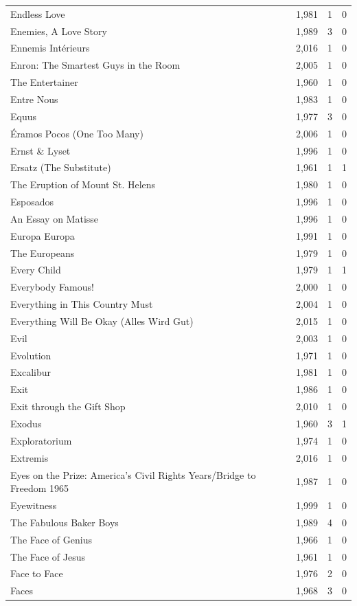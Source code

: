 \begin{tabular}{lrrr}
Endless Love & 1,981 & 1 & 0 \\
Enemies, A Love Story & 1,989 & 3 & 0 \\
Ennemis Intérieurs & 2,016 & 1 & 0 \\
Enron: The Smartest Guys in the Room & 2,005 & 1 & 0 \\
The Entertainer & 1,960 & 1 & 0 \\
Entre Nous & 1,983 & 1 & 0 \\
Equus & 1,977 & 3 & 0 \\
Éramos Pocos (One Too Many) & 2,006 & 1 & 0 \\
Ernst \& Lyset & 1,996 & 1 & 0 \\
Ersatz (The Substitute) & 1,961 & 1 & 1 \\
The Eruption of Mount St. Helens & 1,980 & 1 & 0 \\
Esposados & 1,996 & 1 & 0 \\
An Essay on Matisse & 1,996 & 1 & 0 \\
Europa Europa & 1,991 & 1 & 0 \\
The Europeans & 1,979 & 1 & 0 \\
Every Child & 1,979 & 1 & 1 \\
Everybody Famous! & 2,000 & 1 & 0 \\
Everything in This Country Must & 2,004 & 1 & 0 \\
Everything Will Be Okay (Alles Wird Gut) & 2,015 & 1 & 0 \\
Evil & 2,003 & 1 & 0 \\
Evolution & 1,971 & 1 & 0 \\
Excalibur & 1,981 & 1 & 0 \\
Exit & 1,986 & 1 & 0 \\
Exit through the Gift Shop & 2,010 & 1 & 0 \\
Exodus & 1,960 & 3 & 1 \\
Exploratorium & 1,974 & 1 & 0 \\
Extremis & 2,016 & 1 & 0 \\
Eyes on the Prize: America's Civil Rights Years/Bridge to Freedom 1965 & 1,987 & 1 & 0 \\
Eyewitness & 1,999 & 1 & 0 \\
The Fabulous Baker Boys & 1,989 & 4 & 0 \\
The Face of Genius & 1,966 & 1 & 0 \\
The Face of Jesus & 1,961 & 1 & 0 \\
Face to Face & 1,976 & 2 & 0 \\
Faces & 1,968 & 3 & 0 \\

\end{tabular}
